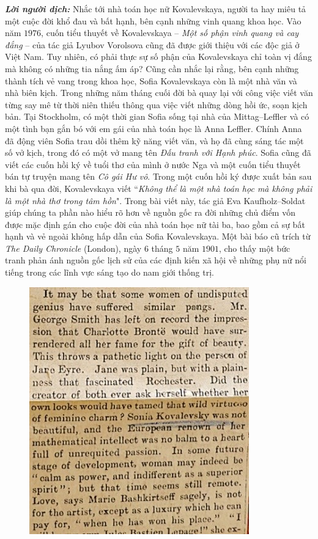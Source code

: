 \vspace*{183pt}

\begin{multicols}{2}
	\textit{\textbf{\color{lichsutoanhoc}Lời người dịch:}} Nhắc tới nhà toán học nữ Kovalevskaya, người ta hay miêu tả một cuộc đời khổ đau và bất hạnh, bên cạnh những vinh quang khoa học. Vào năm $1976$, cuốn tiểu thuyết về Kovalevskaya -- \textit{Một số phận vinh quang và cay đắng} -- của tác giả Lyubov Vorolsova cũng đã được giới thiệu với các độc giả ở Việt Nam. Tuy nhiên, có phải thực sự số phận của Kovalevskaya chỉ toàn vị đắng mà không có những tia nắng ấm áp? Cũng cần nhắc lại rằng, bên cạnh những thành tích vẻ vang trong khoa học, Sofia Kovalevskaya còn là một nhà văn và nhà biên kịch. Trong những năm tháng cuối đời bà quay lại với công việc viết văn từng say mê từ thời niên thiếu thông qua việc viết những dòng hồi ức, soạn kịch bản. Tại Stockholm, có một thời gian Sofia sống tại nhà của Mittag--Leffler và có một tình bạn gắn bó với em gái của nhà toán học là Anna Leffler. Chính Anna đã động viên Sofia trau dồi thêm kỹ năng viết văn, và họ đã cùng sáng tác một số vở kịch, trong đó có một vở mang tên \textit{Đấu tranh với Hạnh phúc}. Sofia cũng đã viết các cuốn hồi ký về tuổi thơ của mình ở nước Nga và  một cuốn tiểu thuyết bán tự truyện mang tên \textit{Cô gái Hư vô}.  Trong một cuốn hồi ký được xuất bản sau khi bà qua đời, Kovalevskaya viết ``\textit{Không thể là một nhà toán học mà không phải là một nhà thơ trong tâm hồn}". Trong bài viết này, tác giả Eva Kaufholz--Soldat giúp chúng ta phần nào hiểu rõ hơn về nguồn gốc ra đời những chủ điểm vốn được mặc định gán cho cuộc đời của nhà toán học nữ tài ba, bao gồm cả sự bất hạnh và vẻ ngoài không hấp dẫn của Sofia Kovalevskaya.
	\vskip 0.1cm
	Một bài báo cũ trích từ \textit{The Daily Chronicle} (London), ngày $6$ tháng $5$ năm $1901$, cho thấy một bức tranh phản ánh nguồn gốc lịch sử của các định kiến xã hội về những phụ nữ nổi tiếng trong các lĩnh vực sáng tạo do nam giới thống trị. 
	\begin{figure}[H]
		\vspace*{-5pt}
		\centering
		\captionsetup{labelformat= empty, justification=centering}
		\includegraphics[width= 0.8\linewidth]{1}

\end{figure}
\end{multicols}

